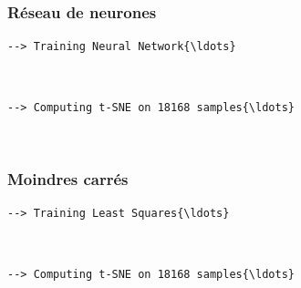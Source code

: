 \documentclass[11pt]{article}
\begin{document}
\subsubsection{Réseau de neurones}\label{ruxe9seau-de-neurones}

\begin{Verbatim}[commandchars=\\\{\}]
  --> Training Neural Network{\ldots}
\end{Verbatim}

\begin{center}
\end{center}
{ \hspace*{\fill} \\}

\begin{Verbatim}[commandchars=\\\{\}]
  --> Computing t-SNE on 18168 samples{\ldots}
\end{Verbatim}

\begin{center}
\end{center}
{ \hspace*{\fill} \\}

\subsubsection{Moindres carrés}\label{moindres-carruxe9s}

\begin{Verbatim}[commandchars=\\\{\}]
  --> Training Least Squares{\ldots}
\end{Verbatim}

\begin{center}
\end{center}
{ \hspace*{\fill} \\}

\begin{Verbatim}[commandchars=\\\{\}]
  --> Computing t-SNE on 18168 samples{\ldots}
\end{Verbatim}
\end{document}
